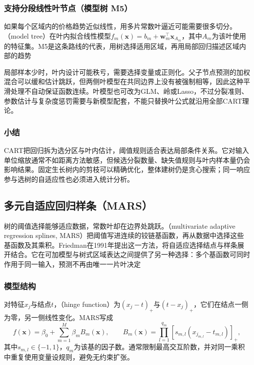 \subsubsection{支持分段线性叶节点（模型树 M5）}
\label{sec:regression-model-tree}

如果每个区域内的价格趋势近似线性，用多片常数叶逼近可能需要很多切分。（model tree）在叶内拟合线性模型$f_m(\bm{x})=b_m+\bm{w}_m^{\top}\bm{x}_{A_m}$，其中$A_m$为该叶使用的特征集。M5是这条路线的代表，用树选择适用区域，再用局部回归描述区域内部的趋势

局部样本少时，叶内设计可能秩亏，需要选择变量或正则化。父子节点预测的加权混合可以缓和估计跳跃，但两侧叶模型在共同边界上没有被强制相等，因此这种平滑处理不自动保证函数连续。叶模型也可改为GLM、岭或Lasso，不过分裂准则、参数估计与复杂度惩罚需要与新模型配套，不能只替换叶公式就沿用全部CART理论。

\subsubsection{小结}

CART把回归拆为选分区与叶内估计，阈值规则适合表达局部条件关系。它对输入单位缩放通常不如距离方法敏感，但候选分裂数量、缺失值规则与叶内样本量仍会影响结果。固定生长树内的剪枝可以精确优化，整体建树仍是贪心搜索；同一响应参与选树的自适应性也必须进入统计分析。

\subsection{多元自适应回归样条（MARS）}
\label{sec:regression-mars}

树的阈值选择能够适应数据，常数叶却在边界处跳跃。（multivariate adaptive regression splines, MARS）把阈值写进连续的铰链基函数，再从数据中选择这些基函数及其乘积。Friedman在1991年提出这一方法，将自适应选择结点与样条展开结合。它在可加模型与树式区域表达之间提供了另一种选择：多个基函数可同时作用于同一输入，预测不再由唯一一片叶决定

\subsubsection{模型结构}

对特征$x_j$与结点$t$，（hinge function）为$(x_j-t)_+$与$(t-x_j)_+$，它们在结点一侧为零，另一侧线性变化。MARS写成
\begin{equation}
  f(\bm{x})=\beta_0+\sum_{m=1}^{M}\beta_m B_m(\bm{x}),
  \qquad
  B_m(\bm{x})=\prod_{l=1}^{q_m}
                 [s_{m,l}(x_{j_{m,l}}-t_{m,l})]_+,
  \label{eq:regression-mars}
\end{equation}
其中$s_{m,l}\in\{-1,1\}$，$q_m$为该基的因子数。通常限制最高交互阶数，并对同一乘积中重复使用变量设规则，避免无约束扩张。

